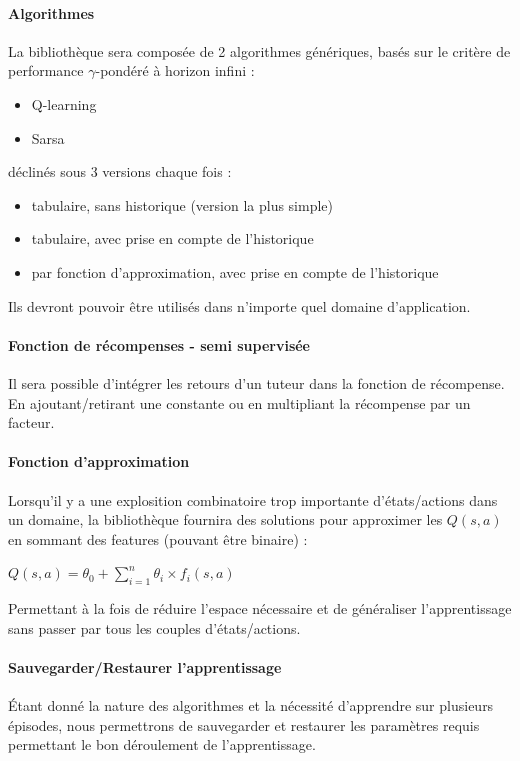 \documentclass[a4paper,12pt]{article}
\begin{document}
		\paragraph{Algorithmes} La bibliothèque sera composée de 2 algorithmes génériques, basés sur le critère 
		de performance $\gamma$-pondéré à horizon infini : 
		  \begin{itemize}
			  \item Q-learning
			  \item Sarsa
		  \end{itemize}
		  déclinés sous 3 versions chaque fois :
		  \begin{itemize}
			  \item tabulaire, sans historique (version la plus simple)
			  \item tabulaire, avec prise en compte de l'historique
			  \item par fonction d'approximation, avec prise en compte de l'historique
		  \end{itemize}
		 Ils devront pouvoir être utilisés dans n'importe quel domaine d'application.
		  
		\paragraph{Fonction de récompenses - semi supervisée} Il sera possible d'intégrer les retours d'un 
			tuteur dans la fonction de récompense. En ajoutant/retirant une constante 
			ou en multipliant la récompense par un facteur.
		\paragraph{Fonction d'approximation} Lorsqu'il y a une explosition combinatoire trop 
		importante d'états/actions dans
		un domaine, la bibliothèque fournira des solutions pour approximer les $Q(s,a)$ en
		sommant des features (pouvant être binaire) :
		\begin{center}
		 $Q(s,a) = \theta_{0} + \sum\limits_{i=1}^n \theta_{i} \times f_{i}(s,a)$
		\end{center}
		Permettant à la fois de réduire l'espace nécessaire et de généraliser l'apprentissage
		sans passer par tous les couples d'états/actions.
		
		\paragraph{Sauvegarder/Restaurer l'apprentissage} Étant donné la nature des algorithmes
		et la nécessité d'apprendre sur plusieurs épisodes, nous permettrons de sauvegarder
		et restaurer les paramètres requis permettant le bon déroulement de l'apprentissage.
		
\end{document}
